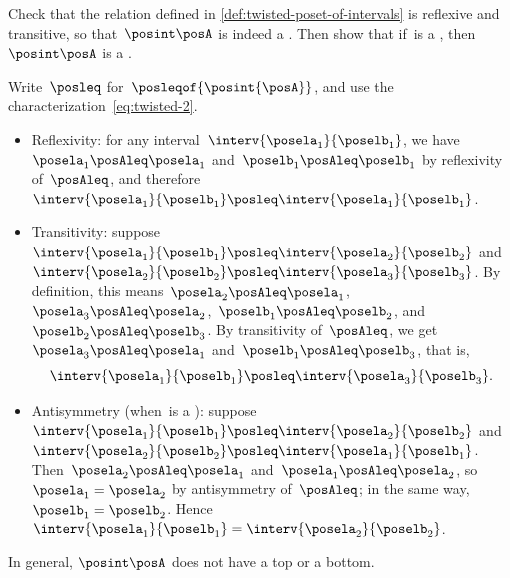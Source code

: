 \begin{exercise}
    Check that the relation defined in \cref{def:twisted-poset-of-intervals} is reflexive and transitive, so that~$\posint\posA$ is indeed a .
    Then show that if~\posA is a , then~$\posint\posA$ is a .
\end{exercise}
\begin{solution}
    Write~$\posleq$ for~$\posleqof{\posint{\posA}}$, and use the characterization~\eqref{eq:twisted-2}.
    \begin{itemize}
        \item Reflexivity: for any interval~$\interv{\posela_1}{\poselb_1}$, we have~$\posela_1\posAleq \posela_1$ and~$\poselb_1\posAleq \poselb_1$ by reflexivity of~$\posAleq$, and therefore~$\interv{\posela_1}{\poselb_1} \posleq \interv{\posela_1}{\poselb_1}$.
        \item Transitivity: suppose~$\interv{\posela_1}{\poselb_1} \posleq \interv{\posela_2}{\poselb_2}$ and~$\interv{\posela_2}{\poselb_2} \posleq \interv{\posela_3}{\poselb_3}$.
              By definition, this means~$\posela_2 \posAleq \posela_1$,~$\posela_3 \posAleq \posela_2$,~$\poselb_1 \posAleq \poselb_2$, and~$\poselb_2 \posAleq \poselb_3$.
              By transitivity of~$\posAleq$, we get~$\posela_3 \posAleq \posela_1$ and~$\poselb_1 \posAleq \poselb_3$, that is,
              \begin{equation}
                  \interv{\posela_1}{\poselb_1} \posleq \interv{\posela_3}{\poselb_3}.
              \end{equation}
        \item Antisymmetry (when~\posA is a ): suppose~$\interv{\posela_1}{\poselb_1} \posleq \interv{\posela_2}{\poselb_2}$ and~$\interv{\posela_2}{\poselb_2} \posleq \interv{\posela_1}{\poselb_1}$.
              Then~$\posela_2 \posAleq \posela_1$ and~$\posela_1 \posAleq \posela_2$, so~$\posela_1=\posela_2$ by antisymmetry of~$\posAleq$; in the same way,~$\poselb_1=\poselb_2$.
              Hence~$\interv{\posela_1}{\poselb_1} = \interv{\posela_2}{\poselb_2}$.
    \end{itemize}
\end{solution}

In general, $\posint\posA$ does not have a top or a bottom.

\vfill
\clearpage

